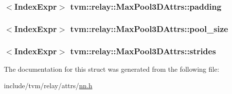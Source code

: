 \subsubsection[{\texorpdfstring{padding}{padding}}]{$<${\bf Index\+Expr}$>$ tvm\+::relay\+::\+Max\+Pool3\+D\+Attrs\+::padding}\hypertarget{structtvm_1_1relay_1_1MaxPool3DAttrs_af80ff276969ce1fa8ee324204a93edaf}{}\label{structtvm_1_1relay_1_1MaxPool3DAttrs_af80ff276969ce1fa8ee324204a93edaf}
\subsubsection[{\texorpdfstring{pool\+\_\+size}{pool_size}}]{$<${\bf Index\+Expr}$>$ tvm\+::relay\+::\+Max\+Pool3\+D\+Attrs\+::pool\+\_\+size}\hypertarget{structtvm_1_1relay_1_1MaxPool3DAttrs_a82691187858d9ecc11176b6195fc97c4}{}\label{structtvm_1_1relay_1_1MaxPool3DAttrs_a82691187858d9ecc11176b6195fc97c4}
\subsubsection[{\texorpdfstring{strides}{strides}}]{$<${\bf Index\+Expr}$>$ tvm\+::relay\+::\+Max\+Pool3\+D\+Attrs\+::strides}\hypertarget{structtvm_1_1relay_1_1MaxPool3DAttrs_a8cf3ac4fe2048ec78f8b7b8bb80f65ce}{}\label{structtvm_1_1relay_1_1MaxPool3DAttrs_a8cf3ac4fe2048ec78f8b7b8bb80f65ce}


The documentation for this struct was generated from the following file\+:\begin{DoxyCompactItemize}
\item 
include/tvm/relay/attrs/\hyperlink{include_2tvm_2relay_2attrs_2nn_8h}{nn.\+h}\end{DoxyCompactItemize}
